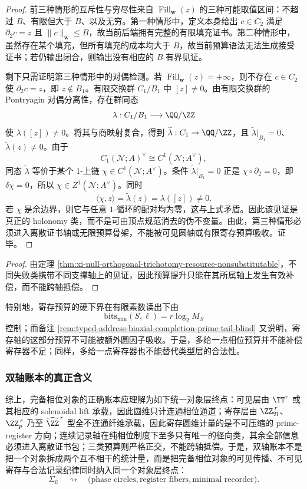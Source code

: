 \begin{proof}
前三种情形的互斥性与穷尽性来自 \(\operatorname{Fill}_{\mathbf w}(z)\) 的三种可能取值区间：不超过 \(B\)、有限但大于 \(B\)、以及无穷。第一种情形中，定义本身给出 \(c\in C_2\) 满足 \(\partial_2c=z\) 且 \(\|c\|_{\mathbf w}\le B\)，故当前后端拥有完整的有限填充证书。第二种情形中，虽然存在某个填充，但所有填充的成本均大于 \(B\)，故当前预算语法无法生成接受证书；若仍输出闭合，则输出没有相应的 \(B\)-有界见证。

剩下只需证明第三种情形中的对偶检测。若 \(\operatorname{Fill}_{\mathbf w}(z)=+\infty\)，则不存在 \(c\in C_2\) 使 \(\partial_2c=z\)，即 \(z\notin B_1\)。有限交换群 \(C_1/B_1\) 中 \([z]\ne0\)。由有限交换群的 Pontryagin 对偶分离性，存在群同态
\[
\lambda:C_1/B_1\longrightarrow \QQ/\ZZ
\]
使 \(\lambda([z])\ne0\)。将其与商映射复合，得到 \(\widetilde\lambda:C_1\to\QQ/\ZZ\)，且 \(\widetilde\lambda|_{B_1}=0\)、\(\widetilde\lambda(z)\ne0\)。由于
\[
C_1(\mathcal N;A)^\vee\cong C^1(\mathcal N;A^\vee),
\]
同态 \(\widetilde\lambda\) 等价于某个 \(1\)-上链 \(\chi\in C^1(\mathcal N;A^\vee)\)。条件 \(\widetilde\lambda|_{B_1}=0\) 正是 \(\chi\circ\partial_2=0\)，即 \(\delta\chi=0\)，所以 \(\chi\in Z^1(\mathcal N;A^\vee)\)。同时
\[
\langle\chi,z\rangle=\widetilde\lambda(z)=\lambda([z])\ne0.
\]
若 \(\chi\) 是余边界，则它与任意 \(1\)-循环的配对均为零，这与上式矛盾。因此该见证是真正的 holonomy 类，而不是可由顶点规范消去的伪不变量。由此，第三种情形必须进入离散证书轴或无限预算骨架，不能被可见圆轴或有限寄存预算吸收。证毕。
\end{proof}

\begin{proof}
由定理 \ref{thm:xi-null-orthogonal-trichotomy-resource-nonsubstitutable}，不同失败类携带不同支撑轴上的见证，因此预算提升只能在其所属轴上发生有效补偿，而不能跨轴抵偿。
\end{proof}

特别地，寄存预算的硬下界在有限素数读出下由
\[
\mathrm{bits}_{\min}(S,\boldsymbol\ell)=r\log_2 M_S
\]
控制；而备注 \ref{rem:typed-address-biaxial-completion-prime-tail-blind} 又说明，寄存轴的这部分预算不可能被额外圆因子吸收。于是，多给一点相位预算并不能补偿寄存器不足；同样，多给一点寄存器也不能替代类型层的合法性。

\subsubsection{双轴账本的真正含义}\label{subsubsec:typed-address-biaxial-completion-ledger-summary}
综上，完备相位对象的正确账本应理解为如下统一对象层终点：可见层由 \(\TT^r\) 或其相应的 solenoidal lift 承载，因此圆维只计连通相位通道；寄存层由 \(\ZZ_{\mathfrak N}^{\,r}\)、\(\ZZ_p^{\,r}\) 乃至 \(\widehat{\ZZ}^{\,r}\) 型全不连通纤维承载，因此寄存圆维计量的是不可压缩的 prime-register 方向；连续记录轴在纯相位制度下至多只有唯一的径向类，其余全部信息必须进入离散证书包；三类预算则严格正交，不能跨轴抵偿。于是，双轴账本不是把一个对象拆成两个互不相干的统计量，而是把完备相位对象的可见传播、不可见寄存与合法记录纪律同时纳入同一个对象层终点：
\[
\Sigma_{\hat u}
\quad\rightsquigarrow\quad
\bigl(
\text{phase circles},
\text{register fibers},
\text{minimal recorder}
\bigr).
\]
